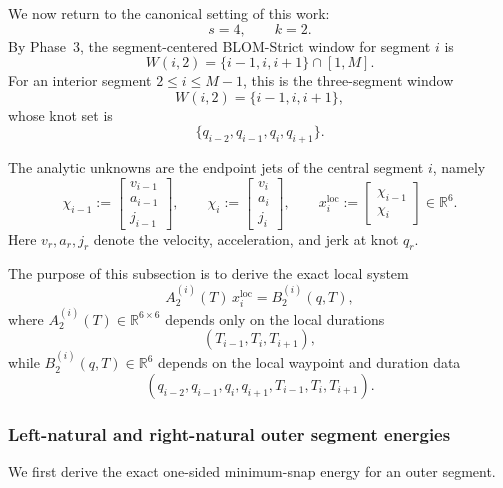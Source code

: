 We now return to the canonical setting of this work:
\[
s=4,\qquad k=2.
\]
By Phase~3, the segment-centered BLOM-Strict window for segment \(i\) is
\[
W(i,2)=\{i-1,i,i+1\}\cap[1,M].
\]
For an interior segment \(2\le i\le M-1\), this is the three-segment window
\[
W(i,2)=\{i-1,i,i+1\},
\]
whose knot set is
\[
\{q_{i-2},q_{i-1},q_i,q_{i+1}\}.
\]

The analytic unknowns are the endpoint jets of the central segment \(i\), namely
\begin{equation}
\label{eq:phase4_local_state_def}
\chi_{i-1}:=
\begin{bmatrix}
v_{i-1}\\ a_{i-1}\\ j_{i-1}
\end{bmatrix},
\qquad
\chi_i:=
\begin{bmatrix}
v_i\\ a_i\\ j_i
\end{bmatrix},
\qquad
x_i^{\mathrm{loc}}
:=
\begin{bmatrix}
\chi_{i-1}\\ \chi_i
\end{bmatrix}
\in\mathbb R^6.
\end{equation}
Here \(v_r,a_r,j_r\) denote the velocity, acceleration, and jerk at knot \(q_r\).

The purpose of this subsection is to derive the exact local system
\begin{equation}
\label{eq:phase4_main_local_system}
A_2^{(i)}(T)\,x_i^{\mathrm{loc}}
=
B_2^{(i)}(q,T),
\end{equation}
where \(A_2^{(i)}(T)\in\mathbb R^{6\times 6}\) depends only on the local durations
\[
(T_{i-1},T_i,T_{i+1}),
\]
while \(B_2^{(i)}(q,T)\in\mathbb R^6\) depends on the local waypoint and duration data
\[
(q_{i-2},q_{i-1},q_i,q_{i+1},T_{i-1},T_i,T_{i+1}).
\]

\subsubsection{Left-natural and right-natural outer segment energies}
\label{subsubsec:phase4_outer_segments}

We first derive the exact one-sided minimum-snap energy for an outer segment.

